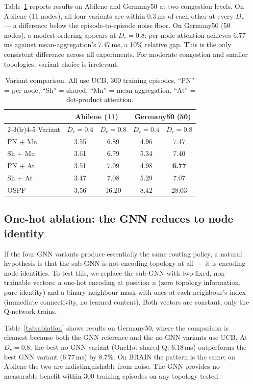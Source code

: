 \documentclass[10pt,twocolumn,letterpaper]{article}
\begin{document}
Table~\ref{tab:variants} reports results on Abilene and Germany50 at
two congestion levels. On Abilene (11 nodes), all four variants are
within 0.3\,ms of each other at every $D_r$ — a difference below the
episode-to-episode noise floor. On Germany50 (50 nodes), a modest
ordering appears at $D_r = 0.8$: per-node attention achieves 6.77\,ms
against mean-aggregation's 7.47\,ms, a 10\% relative gap. This is the
only consistent difference across all experiments. For moderate
congestion and smaller topologies, variant choice is irrelevant.

\begin{table}[t]
\centering
\caption{Variant comparison. All use UCB, 300 training episodes.
``PN'' = per-node, ``Sh'' = shared, ``Mn'' = mean aggregation,
``At'' = dot-product attention.}
\label{tab:variants}
\small
\setlength{\tabcolsep}{4pt}
\begin{tabular}{lcccc}
\toprule
 & \multicolumn{2}{c}{Abilene (11)} &
   \multicolumn{2}{c}{Germany50 (50)} \\
\cmidrule(lr){2-3}\cmidrule(lr){4-5}
Variant & $D_r{=}0.4$ & $D_r{=}0.8$ & $D_r{=}0.4$ & $D_r{=}0.8$ \\
\midrule
PN + Mn & 3.55 & 6.89 & 4.96 & 7.47 \\
Sh + Mn & 3.61 & 6.79 & 5.34 & 7.40 \\
PN + At & 3.51 & 7.09 & 4.98 & \textbf{6.77} \\
Sh + At & 3.47 & 7.08 & 5.29 & 7.07 \\
\midrule
OSPF & 3.56 & 16.20 & 8.42 & 28.03 \\
\bottomrule
\end{tabular}
\end{table}

\subsection{One-hot ablation: the GNN reduces to node identity}

If the four GNN variants produce essentially the same routing policy,
a natural hypothesis is that the sub-GNN is not encoding topology at
all — it is encoding node identities. To test this, we replace the
sub-GNN with two fixed, non-trainable vectors: a one-hot encoding at
position $n$ (zero topology information, pure identity) and a binary
neighbour mask with ones at each neighbour's index (immediate
connectivity, no learned content). Both vectors are constant; only the
Q-network trains.

Table~\ref{tab:ablation} shows results on Germany50, where the
comparison is cleanest because both the GNN reference and the no-GNN
variants use UCB. At $D_r = 0.8$, the best no-GNN variant (OneHot
shared-Q: 6.18\,ms) outperforms the best GNN variant (6.77\,ms) by
8.7\%. On BRAIN the pattern is the same; on Abilene the two are
indistinguishable from noise. The GNN provides no measurable benefit
within 300 training episodes on any topology tested.
\end{document}
